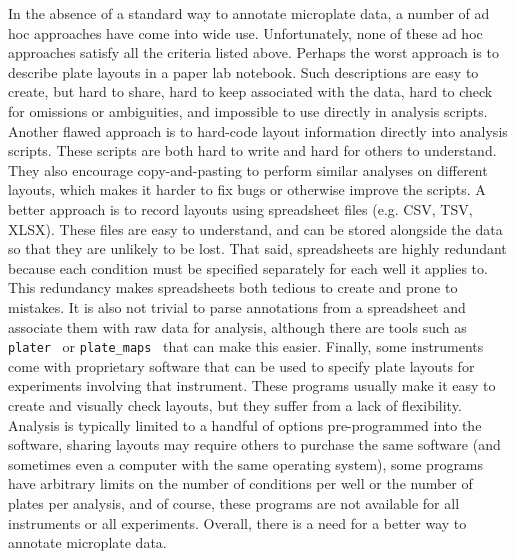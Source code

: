\documentclass{bmcart}
\begin{document}
In the absence of a standard way to annotate microplate data, a number of ad
hoc approaches have come into wide use. Unfortunately, none of these ad hoc
approaches satisfy all the criteria listed above.  Perhaps the worst approach
is to describe plate layouts in a paper lab notebook. Such descriptions are
easy to create, but hard to share, hard to keep associated with the data, hard
to check for omissions or ambiguities, and impossible to use directly in
analysis scripts.  Another flawed approach is to hard-code layout information
directly into analysis scripts. These scripts are both hard to write and hard
for others to understand. They also encourage copy-and-pasting to perform
similar analyses on different layouts, which makes it harder to fix bugs or
otherwise improve the scripts. A better approach is to record layouts using
spreadsheet files (e.g. CSV, TSV, XLSX). These files are easy to understand,
and can be stored alongside the data so that they are unlikely to be lost. That
said, spreadsheets are highly redundant because each condition must be
specified separately for each well it applies to. This redundancy makes
spreadsheets both tedious to create and prone to mistakes. It is also not
trivial to parse annotations from a spreadsheet and associate them with raw
data for analysis, although there are tools such as
\texttt{plater}~\cite{hughes2020} or \texttt{plate\_maps}~\cite{jones2014} that
can make this easier.  Finally, some instruments come with proprietary software
that can be used to specify plate layouts for experiments involving that
instrument.  These programs usually make it easy to create and visually check
layouts, but they suffer from a lack of flexibility. Analysis is typically
limited to a handful of options pre-programmed into the software, sharing
layouts may require others to purchase the same software (and sometimes even a
computer with the same operating system), some programs have arbitrary limits
on the number of conditions per well or the number of plates per analysis, and
of course, these programs are not available for all instruments or all
experiments. Overall, there is a need for a better way to annotate microplate
data.
\end{document}
